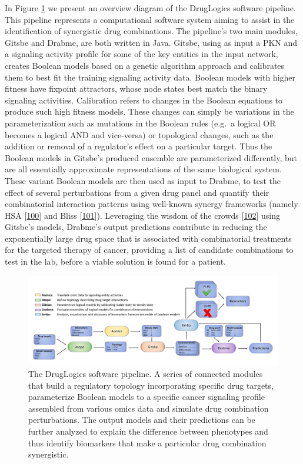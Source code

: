\documentclass[
  12pt,
]{book}
\begin{document}
In Figure \ref{fig:fig5} we present an overview diagram of the DrugLogics software pipeline.
This pipeline represents a computational software system aiming to assist in the identification of synergistic drug combinations.
The pipeline's two main modules, Gitsbe and Drabme, are both written in Java.
Gitsbe, using as input a PKN and a signaling activity profile for some of the key entities in the input network, creates Boolean models based on a genetic algorithm approach and calibrates them to best fit the training signaling activity data.
Boolean models with higher fitness have fixpoint attractors, whose node states best match the binary signaling activities.
Calibration refers to changes in the Boolean equations to produce such high fitness models.
These changes can simply be variations in the parameterization such as mutations in the Boolean rules (e.g.~a logical OR becomes a logical AND and vice-versa) or topological changes, such as the addition or removal of a regulator's effect on a particular target.
Thus the Boolean models in Gitsbe's produced ensemble are parameterized differently, but are all essentially approximate representations of the same biological system.
These variant Boolean models are then used as input to Drabme, to test the effect of several perturbations from a given drug panel and quantify their combinatorial interaction patterns using well-known synergy frameworks (namely HSA {[}\protect\hyperlink{ref-gaddum1940pharmacology}{100}{]} and Bliss {[}\protect\hyperlink{ref-Bliss1939}{101}{]}).
Leveraging the wisdom of the crowds {[}\protect\hyperlink{ref-Saez-Rodriguez2016}{102}{]} using Gitsbe's models, Drabme's output predictions contribute in reducing the exponentially large drug space that is associated with combinatorial treatments for the targeted therapy of cancer, providing a list of candidate combinations to test in the lab, before a viable solution is found for a patient.



\begin{figure}
\includegraphics[width=1\linewidth]{img/pipeline} \caption{The DrugLogics software pipeline. A series of connected modules that build a regulatory topology incorporating specific drug targets, parameterize Boolean models to a specific cancer signaling profile assembled from various omics data and simulate drug combination perturbations. The output models and their predictions can be further analyzed to explain the difference between phenotypes and thus identify biomarkers that make a particular drug combination synergistic.}\label{fig:fig5}
\end{figure}
\end{document}
